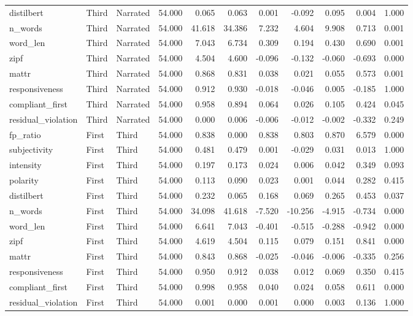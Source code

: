 \documentclass[10pt]{article}
\begin{document}
{\begin{longtable}{lllrrrrrrrr}
distilbert & Third & Narrated & 54.000 & 0.065 & 0.063 & 0.001 & -0.092 & 0.095 & 0.004 & 1.000 \\
n\_words & Third & Narrated & 54.000 & 41.618 & 34.386 & 7.232 & 4.604 & 9.908 & 0.713 & 0.001 \\
word\_len & Third & Narrated & 54.000 & 7.043 & 6.734 & 0.309 & 0.194 & 0.430 & 0.690 & 0.001 \\
zipf & Third & Narrated & 54.000 & 4.504 & 4.600 & -0.096 & -0.132 & -0.060 & -0.693 & 0.000 \\
mattr & Third & Narrated & 54.000 & 0.868 & 0.831 & 0.038 & 0.021 & 0.055 & 0.573 & 0.001 \\
responsiveness & Third & Narrated & 54.000 & 0.912 & 0.930 & -0.018 & -0.046 & 0.005 & -0.185 & 1.000 \\
compliant\_first & Third & Narrated & 54.000 & 0.958 & 0.894 & 0.064 & 0.026 & 0.105 & 0.424 & 0.045 \\
residual\_violation & Third & Narrated & 54.000 & 0.000 & 0.006 & -0.006 & -0.012 & -0.002 & -0.332 & 0.249 \\
fp\_ratio & First & Third & 54.000 & 0.838 & 0.000 & 0.838 & 0.803 & 0.870 & 6.579 & 0.000 \\
subjectivity & First & Third & 54.000 & 0.481 & 0.479 & 0.001 & -0.029 & 0.031 & 0.013 & 1.000 \\
intensity & First & Third & 54.000 & 0.197 & 0.173 & 0.024 & 0.006 & 0.042 & 0.349 & 0.093 \\
polarity & First & Third & 54.000 & 0.113 & 0.090 & 0.023 & 0.001 & 0.044 & 0.282 & 0.415 \\
distilbert & First & Third & 54.000 & 0.232 & 0.065 & 0.168 & 0.069 & 0.265 & 0.453 & 0.037 \\
n\_words & First & Third & 54.000 & 34.098 & 41.618 & -7.520 & -10.256 & -4.915 & -0.734 & 0.000 \\
word\_len & First & Third & 54.000 & 6.641 & 7.043 & -0.401 & -0.515 & -0.288 & -0.942 & 0.000 \\
zipf & First & Third & 54.000 & 4.619 & 4.504 & 0.115 & 0.079 & 0.151 & 0.841 & 0.000 \\
mattr & First & Third & 54.000 & 0.843 & 0.868 & -0.025 & -0.046 & -0.006 & -0.335 & 0.256 \\
responsiveness & First & Third & 54.000 & 0.950 & 0.912 & 0.038 & 0.012 & 0.069 & 0.350 & 0.415 \\
compliant\_first & First & Third & 54.000 & 0.998 & 0.958 & 0.040 & 0.024 & 0.058 & 0.611 & 0.000 \\
residual\_violation & First & Third & 54.000 & 0.001 & 0.000 & 0.001 & 0.000 & 0.003 & 0.136 & 1.000 \\
\bottomrule
\end{longtable}
}
\end{document}
